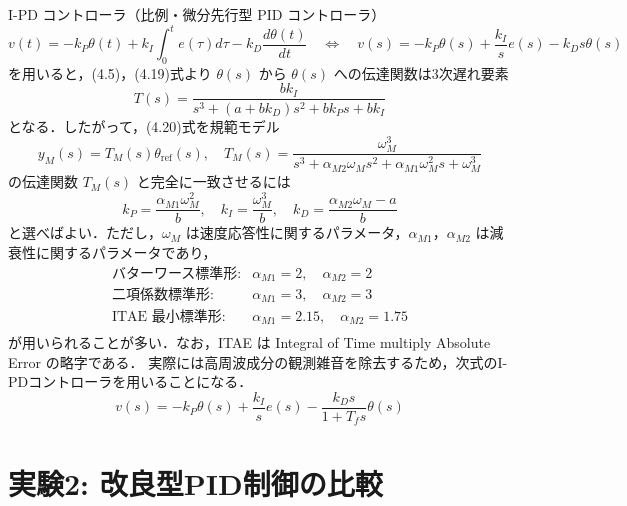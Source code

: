 I-PD コントローラ（比例・微分先行型 PID コントローラ）
\begin{equation}
  v(t) = -k_P \theta(t) + k_I \int_0^t e(\tau) d\tau - k_D \frac{d\theta(t)}{dt} \quad \Longleftrightarrow \quad v(s) = -k_P \theta(s) + \frac{k_I}{s} e(s) - k_D s \theta(s) \tag{4.19}
\end{equation}
を用いると，(4.5)，(4.19)式より \(\theta(s)\) から \(\theta(s)\) への伝達関数は3次遅れ要素
\begin{equation}
  T(s) = \frac{b k_I}{s^3 + (a + b k_D)s^2 + b k_P s + b k_I} \tag{4.20}
\end{equation}
となる．したがって，(4.20)式を規範モデル
\begin{equation}
  y_M(s) = T_M(s) \theta_{\mathrm{ref}}(s), \quad T_M(s) = \frac{\omega_M^3}{s^3 + \alpha_{M2} \omega_M s^2 + \alpha_{M1} \omega_M^2 s + \omega_M^3} \tag{4.21}
\end{equation}
の伝達関数 \(T_M(s)\) と完全に一致させるには
\begin{equation}
  k_P = \frac{\alpha_{M1} \omega_M^2}{b}, \quad k_I = \frac{\omega_M^3}{b}, \quad k_D = \frac{\alpha_{M2} \omega_M - a}{b} \tag{4.22}
\end{equation}
と選べばよい．ただし，\(\omega_M\) は速度応答性に関するパラメータ，\(\alpha_{M1}\)，\(\alpha_{M2}\) は減衰性に関するパラメータであり，
\begin{equation}
  \begin{array}{ll}
    \text{バターワース標準形}: & \alpha_{M1} = 2, \quad \alpha_{M2} = 2       \\
    \text{二項係数標準形}:     & \alpha_{M1} = 3, \quad \alpha_{M2} = 3       \\
    \text{ITAE 最小標準形}:    & \alpha_{M1} = 2.15, \quad \alpha_{M2} = 1.75 \\
  \end{array}
\end{equation}
が用いられることが多い．なお，ITAE は Integral of Time multiply Absolute Error の略字である．
実際には高周波成分の観測雑音を除去するため，次式のI-PDコントローラを用いることになる．
\begin{equation}
  v(s) = -k_P \theta(s) + \frac{k_I}{s}e(s) - \frac{k_D s}{1 + T_f s} \theta(s) \tag{4.23}
\end{equation}


\newpage

\section{実験2: 改良型PID制御の比較}
